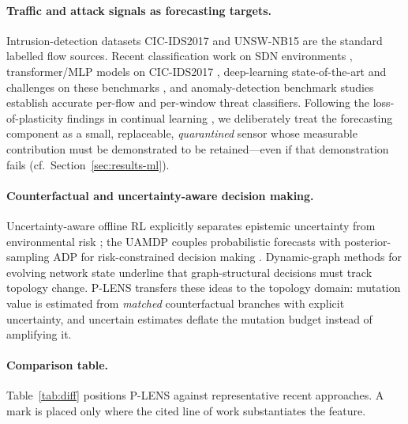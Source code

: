 \documentclass[runningheads]{llncs}
\begin{document}
\paragraph{Traffic and attack signals as forecasting targets.}
Intrusion-detection datasets CIC-IDS2017 \cite{sharafaldin2018} and
UNSW-NB15 \cite{moustafa2015} are the standard labelled flow sources. Recent
classification work on SDN environments \cite{nithya2026}, transformer/MLP
models on CIC-IDS2017 \cite{ali2024bert}, deep-learning state-of-the-art and
challenges on these benchmarks \cite{wu2024}, and anomaly-detection
benchmark studies \cite{kumar2026} establish accurate per-flow and
per-window threat classifiers. Following the loss-of-plasticity findings in
continual learning \cite{dohare2024,dohare2023}, we deliberately treat the
forecasting component as a small, replaceable, \emph{quarantined} sensor
whose measurable contribution must be demonstrated to be retained—even if
that demonstration fails (cf.\ Section~\ref{sec:results-ml}).

\paragraph{Counterfactual and uncertainty-aware decision making.}
Uncertainty-aware offline RL explicitly separates epistemic uncertainty from
environmental risk \cite{chen2024uadac}; the UAMDP couples probabilistic
forecasts with posterior-sampling ADP for risk-constrained decision making
\cite{uamdp2025}. Dynamic-graph methods for evolving network state
\cite{zheng2025,gkarmpounis2024} underline that graph-structural decisions
must track topology change. P-LENS transfers these ideas to the topology
domain: mutation value is estimated from \emph{matched} counterfactual
branches with explicit uncertainty, and uncertain estimates deflate the
mutation budget instead of amplifying it.

\paragraph{Comparison table.}
Table~\ref{tab:diff} positions P-LENS against representative recent
approaches. A mark is placed only where the cited line of work substantiates
the feature.
\end{document}
